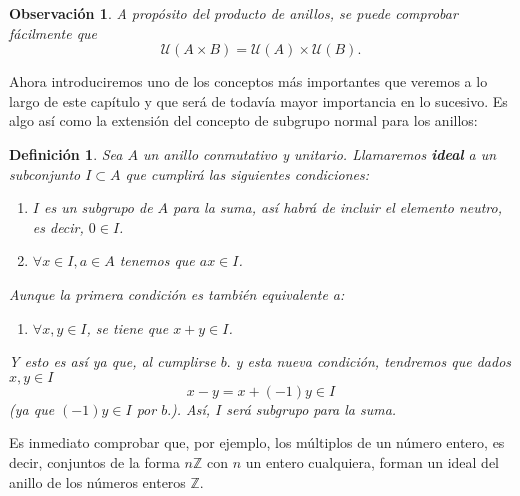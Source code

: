 \documentclass[12pt]{article}
\newtheorem{definition}[theorem]{Definición}
\newtheorem{observation}{Observación}[theorem]
\begin{document}
\begin{observation}A propósito del producto de anillos, se puede comprobar fácilmente que $$\mathcal{U}(A \times B) = \mathcal{U}(A) \times \mathcal{U}(B).$$
\end{observation}

Ahora introduciremos uno de los conceptos más importantes que veremos a lo largo de este capítulo y que será de todavía mayor importancia en lo sucesivo. Es algo así como la extensión del concepto de subgrupo normal para los anillos: 

\begin{definition}Sea $A$ un anillo conmutativo y unitario. Llamaremos \textbf{ideal} a un subconjunto $I \subset A$ que cumplirá las siguientes condiciones: \renewcommand{\labelenumi}{\arabic{enumi}.}
\begin{enumerate}
\item $I$ es un subgrupo de $A$ para la suma, así habrá de incluir el elemento neutro, es decir, $0 \in I$.
\item $\forall x \in I, a \in A$ tenemos que $ax \in I$.
\end{enumerate}
Aunque la primera condición es también equivalente a: \begin{enumerate}
\item $\forall x,y \in I$, se tiene que $x+y \in I$. 
\end{enumerate}
Y esto es así ya que, al cumplirse $b.$ y esta nueva condición, tendremos que dados $x,y \in I$ $$x-y = x +(-1)y \in I$$ (ya que $(-1)y \in I$ por $b.$). Así, $I$ será subgrupo para la suma.
\end{definition}

Es inmediato comprobar que, por ejemplo, los múltiplos de un número entero, es decir, conjuntos de la forma $n\mathbb{Z}$ con $n$ un entero cualquiera, forman un ideal del anillo de los números enteros $\mathbb{Z}$.
\end{document}
